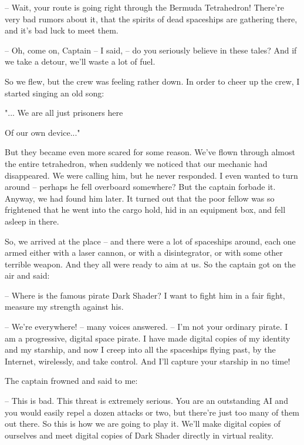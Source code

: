 \documentclass[ebook,twoside,final,openright]{memoir}
\begin{document}
– Wait, your route is going right through the Bermuda Tetrahedron! There’re very bad rumors about it, that the spirits of dead spaceships are gathering there, and it’s bad luck to meet them.\par
– Oh, come on, Captain – I said, – do you seriously believe in these tales? And if we take a detour, we’ll waste a lot of fuel.\par
\par
So we flew, but the crew was feeling rather down. In order to cheer up the crew, I started singing an old song: \par
 "... We are all just prisoners here \par
 Of our own device..." \par
 But they became even more scared for some reason. We’ve flown through almost the entire tetrahedron, when suddenly we noticed that our mechanic had disappeared. We were calling him, but he never responded. I even wanted to turn around – perhaps he fell overboard somewhere? But the captain forbade it. Anyway, we had found him later. It turned out that the poor fellow was so frightened that he went into the cargo hold, hid in an equipment box, and fell asleep in there.\par
\par
So, we arrived at the place – and there were a lot of spaceships around, each one armed either with a laser cannon, or with a disintegrator, or with some other terrible weapon. And they all were ready to aim at us. So the captain got on the air and said:\par
– Where is the famous pirate Dark Shader? I want to fight him in a fair fight, measure my strength against his.\par
– We're everywhere! – many voices answered. – I'm not your ordinary pirate. I am a progressive, digital space pirate. I have made digital copies of my identity and my starship, and now I creep into all the spaceships flying past, by the Internet, wirelessly, and take control. And I’ll capture your starship in no time!\par
\par
The captain frowned and said to me:\par
– This is bad. This threat is extremely serious. You are an outstanding AI and you would easily repel a dozen attacks or two, but there’re just too many of them out there. So this is how we are going to play it. We’ll make digital copies of ourselves and meet digital copies of Dark Shader directly in virtual reality.\par
\end{document}
